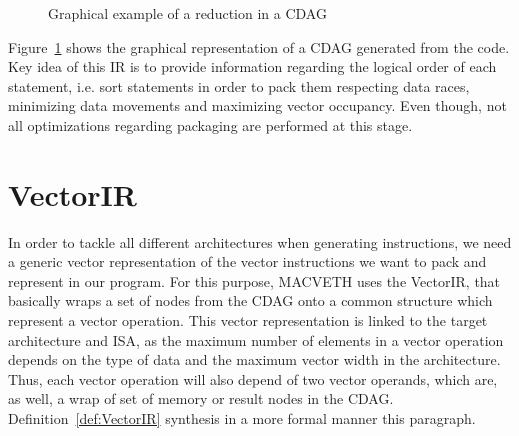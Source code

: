 \begin{figure}[h]
	\centering
{}
\caption{Graphical example of a reduction in a CDAG}
\label{fig:GraphCDAG}
\end{figure}

Figure~\ref{fig:GraphCDAG} shows the graphical representation of a CDAG 
generated from the code. Key idea of this IR is to provide information 
regarding the logical order of each statement, i.e. sort statements in order to 
pack them respecting data races, minimizing data movements and maximizing 
vector occupancy. Even though, not all optimizations regarding packaging are 
performed at this stage.

\section{VectorIR}
In order to tackle all different architectures when generating instructions,
we need a generic vector representation of the vector instructions we want to
pack and represent in our program. For this purpose, MACVETH uses the VectorIR, 
that basically
wraps a set of nodes from the CDAG onto a common structure which represent a 
vector operation. This vector representation is linked to the target 
architecture and ISA, as the maximum number of elements in a vector operation 
depends on the type of data and the maximum vector width in the architecture. 
Thus, each vector operation will also depend of two vector operands, which are, 
as well, a wrap of set of memory or result nodes in the CDAG. 
Definition~\ref{def:VectorIR} synthesis in a more formal manner this paragraph.

